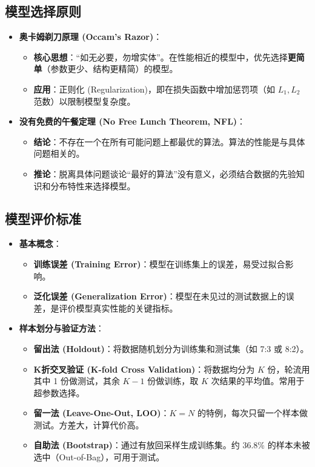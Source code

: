 \documentclass[a4paper, 11pt]{ctexart}
\begin{document}
\subsection{模型选择原则}
\begin{itemize}
    \item \textbf{奥卡姆剃刀原理 (Occam's Razor)}：
    \begin{itemize}
        \item \textbf{核心思想}：“如无必要，勿增实体”。在性能相近的模型中，优先选择\textbf{更简单}（参数更少、结构更精简）的模型。
        \item \textbf{应用}：正则化 (Regularization)，即在损失函数中增加惩罚项（如 $L_1, L_2$ 范数）以限制模型复杂度。
    \end{itemize}
    \item \textbf{没有免费的午餐定理 (No Free Lunch Theorem, NFL)}：
    \begin{itemize}
        \item \textbf{结论}：不存在一个在所有可能问题上都最优的算法。算法的性能是与具体问题相关的。
        \item \textbf{推论}：脱离具体问题谈论“最好的算法”没有意义，必须结合数据的先验知识和分布特性来选择模型。
    \end{itemize}
\end{itemize}

\subsection{模型评价标准}
\begin{itemize}
    \item \textbf{基本概念}：
    \begin{itemize}
        \item \textbf{训练误差 (Training Error)}：模型在训练集上的误差，易受过拟合影响。
        \item \textbf{泛化误差 (Generalization Error)}：模型在未见过的测试数据上的误差，是评价模型真实性能的关键指标。
    \end{itemize}
    \item \textbf{样本划分与验证方法}：
    \begin{itemize}
        \item \textbf{留出法 (Holdout)}：将数据随机划分为训练集和测试集（如 7:3 或 8:2）。
        \item \textbf{K折交叉验证 (K-fold Cross Validation)}：将数据均分为 $K$ 份，轮流用其中 1 份做测试，其余 $K-1$ 份做训练，取 $K$ 次结果的平均值。常用于超参数选择。
        \item \textbf{留一法 (Leave-One-Out, LOO)}：$K=N$ 的特例，每次只留一个样本做测试。方差大，计算代价高。
        \item \textbf{自助法 (Bootstrap)}：通过有放回采样生成训练集。约 36.8\% 的样本未被选中（Out-of-Bag），可用于测试。
    \end{itemize}
\end{itemize}
\end{document}

